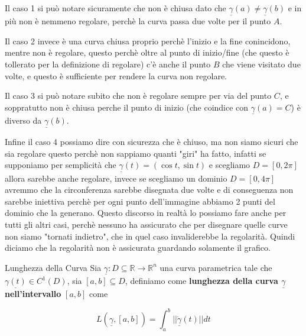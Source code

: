 \documentclass{rapport}
\begin{document}
\begin{minipage}{0.24\textwidth}
    \centering
\end{minipage}
\vspace{0.2cm}


Il caso 1 si può notare sicuramente che non è chiusa dato che $\underline{\gamma}(a)\ne \underline{\gamma}(b) $ e in più non è nemmeno regolare, perchè la curva passa due volte per il punto $A$. 

Il caso 2 invece è una curva chiusa proprio perchè l'inizio e la fine conincidono, mentre non è regolare, questo perchè oltre al punto di inizio/fine (che questo è tollerato per la definizione di regolare) c'è anche il punto $B$ che viene visitato due volte, e questo è sufficiente per rendere la curva non regolare. 

Il caso 3 si può notare subito che non è regolare sempre per via del punto $C$, e soppratutto non è chiusa perche il punto di inizio (che coindice con $\underline{\gamma}(a) = C$) è diverso da  $\underline{\gamma}(b) $. 

Infine il caso 4 possiamo dire con sicurezza che è chiuso, ma non siamo sicuri che sia regolare questo perchè non sappiamo quanti "giri" ha fatto, infatti se supponiamo per semplicità che $\underline{\gamma}(t) = (\cos t, \sin t)$ e scegliamo $D=[0, 2\pi]$ allora sarebbe anche regolare, invece se scegliamo un dominio $D=[0, 4\pi]$ avremmo che la circonferenza sarebbe disegnata due volte e di conseguenza non sarebbe iniettiva perchè per ogni punto dell'immagine abbiamo 2 punti del dominio che la generano. Questo discorso in realtà lo possiamo fare anche per tutti gli altri casi, perchè nessuno ha assicurato che per disegnare quelle curve non siamo "tornati indietro", che in quel caso invaliderebbe la regolarità. Quindi diciamo che la regolarità non è assicurata guardando solamente il grafico. 

\begin{definizione}{Lunghezza della Curva}{}
 Sia  $\underline{\gamma}: D \subseteq \mathbb{R}\to \mathbb{R}^n$ una curva parametrica tale che $\underline{\gamma(t)} \in C^1(D)$, sia $[a, b]\subseteq D$, definiamo come \textbf{lunghezza della curva $\underline{\gamma}$ nell'intervallo} $[a, b]$ come 

 \[
 L(\underline{\gamma}, [a, b]) = \int_{a}^{b} ||\underline{\dot{\gamma}}(t)|| dt
 \]
\end{definizione}
\end{document}
